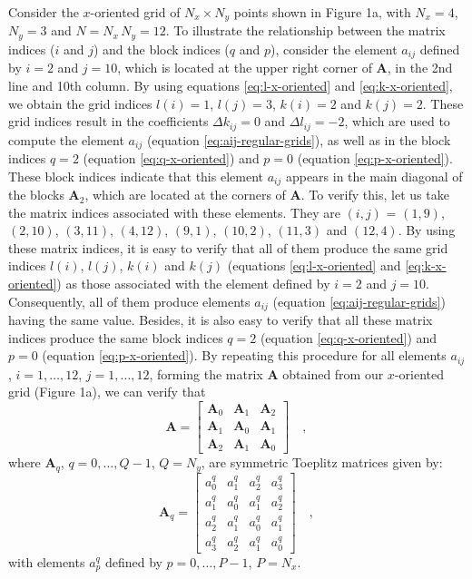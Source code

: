\documentclass[manuscript,revised]{geophysics}
\begin{document}
Consider the $x$-oriented grid of $N_{x} \times N_{y}$ points shown in Figure 1a, 
with $N_{x} = 4$, $N_{y} = 3$ and $N = N_{x} \, N_{y} = 12$.
To illustrate the relationship between the matrix indices ($i$ and $j$) and 
the block indices ($q$ and $p$), consider the element $a_{ij}$ defined by 
$i = 2$ and $j = 10$, which is
located at the upper right corner of $\mathbf{A}$, in the 2nd line and 10th column.
By using equations \ref{eq:l-x-oriented} and \ref{eq:k-x-oriented}, we obtain the 
grid indices $l(i) = 1$, $l(j) = 3$, $k(i) = 2$ and $k(j) = 2$.
These grid indices result in the coefficients $\Delta k_{ij} = 0$ and $\Delta l_{ij} = -2$,
which are used to compute the element $a_{ij}$ (equation \ref{eq:aij-regular-grids}),
as well as in the block indices $q = 2$ (equation \ref{eq:q-x-oriented}) and 
$p = 0$ (equation \ref{eq:p-x-oriented}).
These block indices indicate that this element $a_{ij}$ appears in the main diagonal
of the blocks $\mathbf{A}_{2}$, which are located at the corners of $\mathbf{A}$.
To verify this, let us take the matrix indices associated with these elements.
They are $(i, j)$ = $(1, 9)$, $(2, 10)$, $(3, 11)$, $(4, 12)$, $(9, 1)$, $(10, 2)$, 
$(11, 3)$ and $(12, 4)$. By using these matrix indices, it is easy to verify that all
of them produce the same grid indices $l(i)$, $l(j)$, $k(i)$ and $k(j)$ 
(equations \ref{eq:l-x-oriented} and \ref{eq:k-x-oriented}) as those associated with
the element defined by $i = 2$ and $j = 10$. Consequently, all of them produce
elements $a_{ij}$ (equation \ref{eq:aij-regular-grids}) having the same value.
Besides, it is also easy to verify that all these matrix indices produce the same block
indices $q = 2$ (equation \ref{eq:q-x-oriented}) and $p = 0$ (equation \ref{eq:p-x-oriented}).
By repeating this procedure for all elements $a_{ij}$, $i = 1, \dots, 12$, $j = 1, \dots, 12$, 
forming the matrix $\mathbf{A}$ obtained from our $x$-oriented grid (Figure 1a),
we can verify that
\begin{equation}
\mathbf{A} = \begin{bmatrix}
\mathbf{A}_{0} & \mathbf{A}_{1} & \mathbf{A}_{2} \\
\mathbf{A}_{1} & \mathbf{A}_{0} & \mathbf{A}_{1} \\
\mathbf{A}_{2} & \mathbf{A}_{1} & \mathbf{A}_{0}
\end{bmatrix} \quad ,
\label{eq:A-x-oriented-example}
\end{equation}
where $\mathbf{A}_{q}$, $q = 0, \dots, Q -1$, $Q = N_{y}$, 
are symmetric Toeplitz matrices given by:
\begin{equation}
\mathbf{A}_{q} = \begin{bmatrix}
a^{q}_{0} & a^{q}_{1} & a^{q}_{2} & a^{q}_{3} \\
a^{q}_{1} & a^{q}_{0} & a^{q}_{1} & a^{q}_{2} \\
a^{q}_{2} & a^{q}_{1} & a^{q}_{0} & a^{q}_{1} \\
a^{q}_{3} & a^{q}_{2} & a^{q}_{1} & a^{q}_{0}
\end{bmatrix} \quad ,
\label{eq:Aq-x-oriented}
\end{equation}
with elements $a^{q}_{p}$ defined by $p = 0, \dots, P - 1$, $P = N_{x}$.
\end{document}
